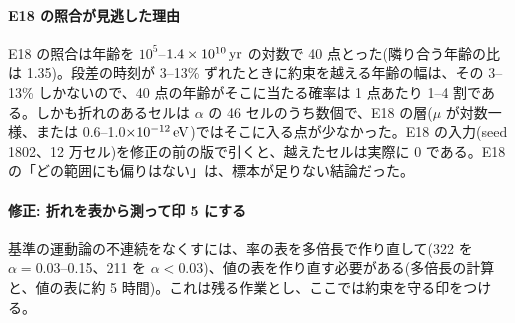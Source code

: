 \paragraph{E18 の照合が見逃した理由}
E18 の照合は年齢を $10^5$--$1.4\times10^{10}\,\mathrm{yr}$ の対数で 40 点とった(隣り合う年齢の比は 1.35)。段差の時刻が 3--13\% ずれたときに約束を越える年齢の幅は、その 3--13\% しかないので、40 点の年齢がそこに当たる確率は 1 点あたり 1--4 割である。しかも折れのあるセルは $\alpha$ の 46 セルのうち数個で、E18 の層($\mu$ が対数一様、または 0.6--1.0$\times10^{-12}\,\mathrm{eV}$)ではそこに入る点が少なかった。E18 の入力(seed 1802、12 万セル)を修正の前の版で引くと、越えたセルは実際に 0 である。E18 の「どの範囲にも偏りはない」は、標本が足りない結論だった。

\paragraph{修正: 折れを表から測って印 5 にする}
基準の運動論の不連続をなくすには、率の表を多倍長で作り直して(322 を $\alpha=0.03$--0.15、211 を $\alpha<0.03$)、値の表を作り直す必要がある(多倍長の計算と、値の表に約 5 時間)。これは残る作業とし、ここでは約束を守る印をつける。

